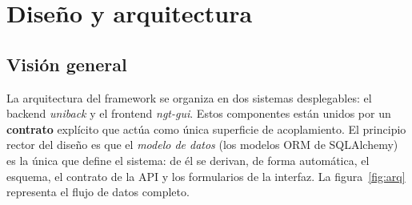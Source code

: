 \chapter{Diseño y arquitectura}

\section{Visión general}
La arquitectura del framework se organiza en dos sistemas desplegables:
el backend \emph{uniback} y el frontend \emph{ngt-gui}. Estos componentes están unidos por un
\textbf{contrato} explícito que actúa como única superficie de acoplamiento.
El principio rector del diseño es que el \emph{modelo de datos} (los modelos
ORM de SQLAlchemy) es la única que define el sistema: de él se derivan, de forma
automática, el esquema, el contrato de la API y los formularios de la
interfaz. La figura~\ref{fig:arq} representa el flujo de datos completo.

